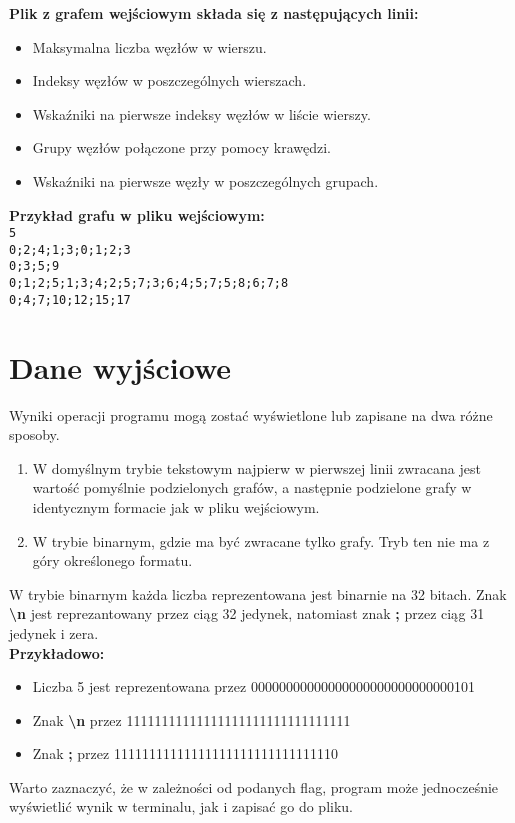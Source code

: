 \documentclass{article}
\begin{document}
\textbf{Plik z grafem wejściowym składa się z następujących linii:}

\begin{itemize}
  \item Maksymalna liczba węzłów w wierszu.
  \item Indeksy węzłów w poszczególnych wierszach.
  \item Wskaźniki na pierwsze indeksy węzłów w liście wierszy.
  \item Grupy węzłów połączone przy pomocy krawędzi.
  \item Wskaźniki na pierwsze węzły w poszczególnych grupach.
\end{itemize}
\textbf{Przykład grafu w pliku wejściowym:}\\
\texttt{5\\0;2;4;1;3;0;1;2;3\\0;3;5;9\\0;1;2;5;1;3;4;2;5;7;3;6;4;5;7;5;8;6;7;8 \\0;4;7;10;12;15;17}

\section*{Dane wyjściowe}
Wyniki operacji programu mogą zostać wyświetlone lub zapisane na dwa różne sposoby.
\begin{enumerate}
\item W domyślnym trybie tekstowym najpierw w pierwszej linii zwracana jest wartość pomyślnie podzielonych grafów, a następnie podzielone grafy w identycznym formacie jak w pliku wejściowym.

\item W trybie binarnym, gdzie ma być zwracane tylko grafy. Tryb ten nie ma z góry określonego formatu.
\end{enumerate}
W trybie binarnym każda liczba reprezentowana jest binarnie na 32 bitach. Znak \textbf{\textbackslash n} jest reprezantowany przez ciąg 32 jedynek, natomiast znak \textbf{;} przez ciąg 31 jedynek i zera.\\

\textbf{Przykładowo:}

\begin{itemize}
  \item Liczba 5 jest reprezentowana przez 00000000000000000000000000000101
  \item Znak \textbf{\textbackslash n} przez 11111111111111111111111111111111
  \item Znak \textbf{;} przez 11111111111111111111111111111110
\end{itemize}
Warto zaznaczyć, że w zależności od podanych flag, program może jednocześnie wyświetlić wynik w terminalu, jak i zapisać go do pliku.\\
\end{document}
